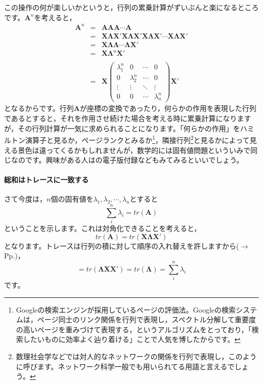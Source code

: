 \documentclass{ltjsbook}
\begin{document}
この操作の何が楽しいかというと，行列の累乗計算がずいぶんと楽になるところです。$\bm{A}^n$を考えると，
\[ \begin{array}{lll}
		\bm{A}^n & = & \bm{AAA}\cdots\bm{A}                                                   \\
		         & = & \bm{X\Lambda X}'\bm{X\Lambda X}'\bm{X\Lambda X}'\cdots\bm{X\Lambda X}' \\
		         & = & \bm{X} \bm{\Lambda\Lambda\cdots\Lambda} \bm{X}'                        \\
		         & = & \bm{X} \bm{\Lambda}^n \bm{X}'                                          \\
		         &   &                                                                        \\
		         & = & \bm{X}
		\begin{pmatrix} \lambda_1^n & 0           & \cdots & 0           \\
                0           & \lambda_2^n & \cdots & 0           \\
                \vdots      & \vdots      & \ddots & \vdots      \\
                0           & 0           & \cdots & \lambda_n^n\end{pmatrix}\bm{X}'
	\end{array}
\]
となるからです。行列$\bm{A}$が座標の変換であったり，何らかの作用を表現した行列であるとすると，それを作用させ続けた場合を考える時に累乗計算になりますが，その行列計算が一気に求められることになります。「何らかの作用」をハミルトン演算子と見るか，ページランクとみるか\footnote{Googleの検索エンジンが採用しているページの評価法。Googleの検索システムは，ページ同士のリンク関係を行列で表現し，スペクトル分解して重要度の高いページを重みづけて表現する，というアルゴリズムをとっており，「検索したいものに効率よく辿り着ける」ことで人気を博したからです。}，隣接行列\footnote{数理社会学などでは対人的なネットワークの関係を行列で表現し，このように呼びます。ネットワーク科学一般でも用いられてる用語と言えるでしょう。}と見るかによって見える景色は違ってくるかもしれませんが，数学的には固有値問題といういみで同じなのです。興味がある人は\textcite{Naganuma20110920}の電子版付録などもみてみるといいでしょう。

\paragraph{総和はトレースに一致する}
\label{sumIsTrace}
さて今度は，$n$個の固有値を$\lambda_1,\lambda_2,\cdots,\lambda_n$とすると
\[ \sum_i^n \lambda_i = tr(\bm{A}) \]
ということを示します。これは対角化できることを考えると，
\[ tr(\bm{A}) = tr(\bm{X\Lambda X}') \]
となります。トレースは行列の積に対して順序の入れ替えを許しますから($\to$Pp.\pageref{defineOfTrace})，
\[ =tr(\bm{\Lambda XX}') = tr(\bm{\Lambda}) = \sum_i^n \lambda_i \]
です。
\end{document}
